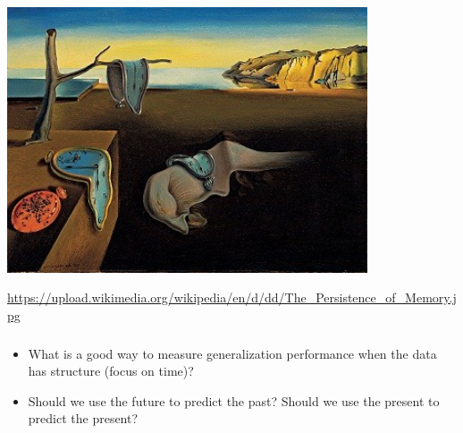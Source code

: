 \documentclass[aspectratio=169]{beamer}
\begin{document}
\begin{frame}
\frametitle{}

\begin{center}
\includegraphics[width=0.8\textwidth]{figures/The_Persistence_of_Memory}
\end{center}

\vfill
\tiny{\url{https://upload.wikimedia.org/wikipedia/en/d/dd/The_Persistence_of_Memory.jpg}}

\end{frame}
\begin{frame}
\frametitle{}

\begin{itemize}
\item What is a good way to measure generalization performance when the data has structure (focus on time)? 
\pause
\item Should we use the future to predict the past? Should we use the present to predict the present?
\end{itemize}

\end{frame}
\end{document}
